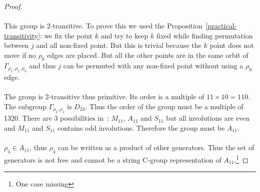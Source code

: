 \begin{proof}
\begin{figure}[H]
\begin{center}
    \caption{}
  \end{center}
\end{figure}

\paragraph{}
This group is 2-transitive. To prove this we used the Proposition~\ref{practical-transitivity}: we fix the point $k$ and try to keep $k$ fixed while finding permutation between $j$ and all non-fixed point. But this is trivial because the $k$ point does not move if no $\rho_0$ edges are placed. But all the other points are in the same orbit of $\Gamma_{\rho_1, \rho_2, \rho_3}$ and thus $j$ can be permuted with any non-fixed point without using a $\rho_0$ edge.

\paragraph{}
The group is 2-transitive thus primitive. Its order is a multiple of $11 \times 10 = 110$. The subgroup $\Gamma_{\rho_2, \rho_3}$ is $D_{24}$. Thus the order of the group must be a multiple of 1320. There are 3 possibilities in~\cite{buekenhout1996list}: $M_{11}$, $A_{11}$ and $S_{11}$ but all involutions are even and $M_{11}$ and $S_{11}$ contains odd involutions. Therefore the group must be $A_{11}$.

\paragraph{}
$\rho_4 \in A_{11}$, thus $\rho_4$ can be written as a product of other generators. Thus the set of generators is not free and cannot be a string C-group representation of $A_{11}$.\footnote{One case missing}


\end{proof}
